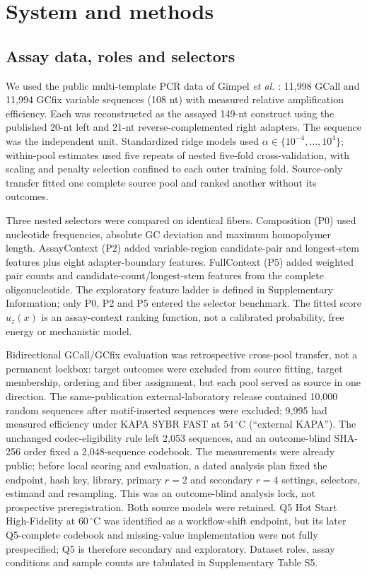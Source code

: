 \documentclass[10pt]{article}
\begin{document}
\section{System and methods}

\subsection{Assay data, roles and selectors}

We used the public multi-template PCR data of Gimpel \emph{et al.} \cite{gimpel2025pcrbias}: 11,998 GCall and 11,994 GCfix variable sequences (108 nt) with measured relative amplification efficiency. Each was reconstructed as the assayed 149-nt construct using the published 20-nt left and 21-nt reverse-complemented right adapters. The sequence was the independent unit. Standardized ridge models used $\alpha\in\{10^{-4},\ldots,10^4\}$; within-pool estimates used five repeats of nested five-fold cross-validation, with scaling and penalty selection confined to each outer training fold. Source-only transfer fitted one complete source pool and ranked another without its outcomes.

Three nested selectors were compared on identical fibers. Composition (P0) used nucleotide frequencies, absolute GC deviation and maximum homopolymer length. AssayContext (P2) added variable-region candidate-pair and longest-stem features plus eight adapter-boundary features. FullContext (P5) added weighted pair counts and candidate-count/longest-stem features from the complete oligonucleotide. The exploratory feature ladder is defined in Supplementary Information; only P0, P2 and P5 entered the selector benchmark. The fitted score $u_z(x)$ is an assay-context ranking function, not a calibrated probability, free energy or mechanistic model.

Bidirectional GCall/GCfix evaluation was retrospective cross-pool transfer, not a permanent lockbox: target outcomes were excluded from source fitting, target membership, ordering and fiber assignment, but each pool served as source in one direction. The same-publication external-laboratory release contained 10,000 random sequences after motif-inserted sequences were excluded; 9,995 had measured efficiency under KAPA SYBR FAST at $54\,^{\circ}$C (``external KAPA''). The unchanged codec-eligibility rule left 2,053 sequences, and an outcome-blind SHA-256 order fixed a 2,048-sequence codebook. The measurements were already public; before local scoring and evaluation, a dated analysis plan fixed the endpoint, hash key, library, primary $r=2$ and secondary $r=4$ settings, selectors, estimand and resampling. This was an outcome-blind analysis lock, not prospective preregistration. Both source models were retained. Q5 Hot Start High-Fidelity at $60\,^{\circ}$C was identified as a workflow-shift endpoint, but its later Q5-complete codebook and missing-value implementation were not fully prespecified; Q5 is therefore secondary and exploratory. Dataset roles, assay conditions and sample counts are tabulated in Supplementary Table S5.
\end{document}
